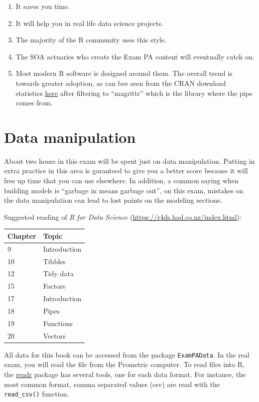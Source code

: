 \documentclass[openany]{book}
\providecommand{\tightlist}{%
  \setlength{\itemsep}{0pt}\setlength{\parskip}{0pt}}
\begin{document}
\begin{enumerate}
\def\labelenumi{\arabic{enumi})}
\tightlist
\item
  It saves you time.
\item
  It will help you in real life data science projects.
\item
  The majority of the R community uses this style.
\item
  The SOA actuaries who create the Exam PA content will eventually catch on.
\item
  Most modern R software is designed around them. The overall trend is towards greater adoption, as can bee seen from the CRAN download statistics \href{https://hadley.shinyapps.io/cran-downloads/}{here} after filtering to ``magrittr'' which is the library where the pipe comes from.
\end{enumerate}

\hypertarget{data-manipulation}{%
\chapter{Data manipulation}\label{data-manipulation}}

About two hours in this exam will be spent just on data manipulation. Putting in extra practice in this area is garanteed to give you a better score because it will free up time that you can use elsewhere. In addition, a common saying when building models is ``garbage in means garbage out'', on this exam, mistakes on the data manipulation can lead to lost points on the modeling sections.

Suggested reading of \emph{R for Data Science} (\url{https://r4ds.had.co.nz/index.html}):

\begin{longtable}[]{@{}ll@{}}
\toprule
Chapter & Topic\tabularnewline
\midrule
\endhead
9 & Introduction\tabularnewline
10 & Tibbles\tabularnewline
12 & Tidy data\tabularnewline
15 & Factors\tabularnewline
17 & Introduction\tabularnewline
18 & Pipes\tabularnewline
19 & Functions\tabularnewline
20 & Vectors\tabularnewline
\bottomrule
\end{longtable}

All data for this book can be accessed from the package \texttt{ExamPAData}. In the real exam, you will read the file from the Prometric computer. To read files into R, the \href{https://readr.tidyverse.org/articles/readr.html}{readr} package has several tools, one for each data format. For instance, the most common format, comma separated values (csv) are read with the \texttt{read\_csv()} function.
\end{document}
